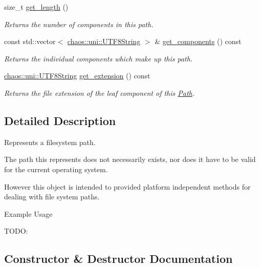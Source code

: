 \begin{DoxyCompactItemize}
size\+\_\+t \hyperlink{classchaos_1_1io_1_1sys_1_1_path_a66471e8a3b9115f1df2ef9c8a337796e}{get\+\_\+length} ()
\begin{DoxyCompactList}\small\item\em Returns the number of components in this path. \end{DoxyCompactList}\item 
const std\+::vector$<$ \hyperlink{classchaos_1_1uni_1_1_u_t_f8_string}{chaos\+::uni\+::\+U\+T\+F8\+String} $>$ \& \hyperlink{classchaos_1_1io_1_1sys_1_1_path_ae20cae838af510b945e716d529e19bf4}{get\+\_\+components} () const 
\begin{DoxyCompactList}\small\item\em Returns the individual components which make up this path. \end{DoxyCompactList}\item 
\hyperlink{classchaos_1_1uni_1_1_u_t_f8_string}{chaos\+::uni\+::\+U\+T\+F8\+String} \hyperlink{classchaos_1_1io_1_1sys_1_1_path_ac7a2b7c374c1e4059b021b2c8751fb39}{get\+\_\+extension} () const 
\begin{DoxyCompactList}\small\item\em Returns the file extension of the leaf component of this \hyperlink{classchaos_1_1io_1_1sys_1_1_path}{Path}. \end{DoxyCompactList}\end{DoxyCompactItemize}


\subsection{Detailed Description}
Represents a filesystem path. 

The path this represents does not necessarily exists, nor does it have to be valid for the current operating system.

However this object is intended to provided platform independent methods for dealing with file system paths.

\begin{DoxyParagraph}{Example Usage}

\end{DoxyParagraph}
T\+O\+D\+O\+: 

\subsection{Constructor \& Destructor Documentation}
\hypertarget{classchaos_1_1io_1_1sys_1_1_path_a4212b2acfcc365769080ea5e915568ee}{}
